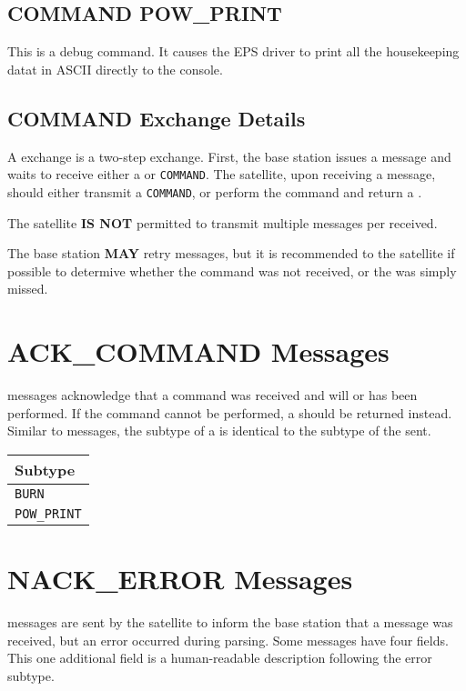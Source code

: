\documentclass{article}
\begin{document}
  \subsection{COMMAND POW\_PRINT}
  This is a debug command. It causes the EPS driver to print all the housekeeping datat in ASCII directly 
  to the console.
  
  \subsection{COMMAND Exchange Details}
  A \mcommand exchange is a two-step exchange. First, the base station issues a \mcommand message and waits to receive either
  a \macommand or \merror \texttt{COMMAND}. The satellite, upon receiving a \mcommand message, should either transmit a \merror 
  \texttt{COMMAND}, or perform the command and return a \macommand.
  
  The satellite \textbf{IS NOT} permitted to transmit multiple \macommand messages per \mcommand received.
  
  The base station \textbf{MAY} retry \mcommand messages, but it is recommended to \mquery the satellite
  if possible to determive whether the command was not received, or the \macommand was simply missed.

\section{ACK\_COMMAND Messages}
  \macommand messages acknowledge that a command was received and will or has been performed. If
  the command cannot be performed, a \merror should be returned instead. Similar to \mresult messages,
  the subtype of a \macommand is identical to the subtype of the \mcommand sent.
  
  
  \begin{center}
  \begin{tabular}{| l |}
    \hline
    Subtype\\ \hline
    \texttt{BURN}\\
    \texttt{POW\_PRINT} \\
    \hline
  \end{tabular}
  \end{center}
  
  
  
\section{NACK\_ERROR Messages}
  \merror messages are sent by the satellite to inform the base station that a message was received, but an error
  occurred during parsing. Some \merror messages have four fields. This one additional field is a human-readable
  description following the error subtype.
  
\end{document}

